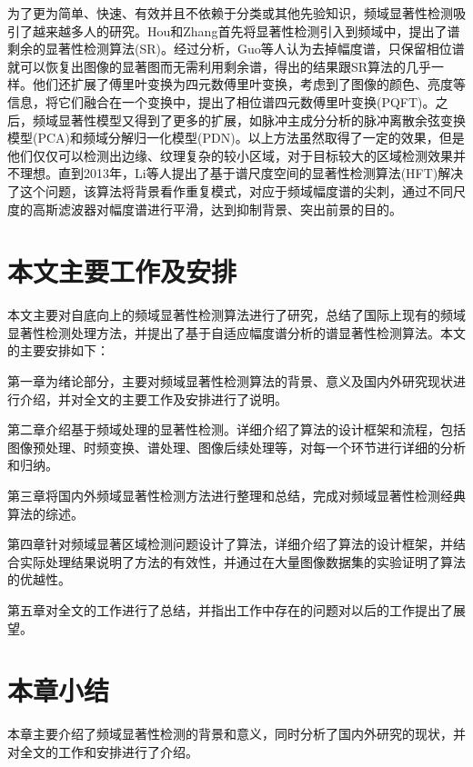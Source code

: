 为了更为简单、快速、有效并且不依赖于分类或其他先验知识，频域显著性检测吸引了越来越多人的研究。Hou和Zhang首先将显著性检测引入到频域中，提出了谱剩余的显著性检测算法(SR)\cite{HouXiaodiCVPR2007Residual}。经过分析，Guo等人\cite{GuoChenleiCVPR2008Spatio}认为去掉幅度谱，只保留相位谱就可以恢复出图像的显著图而无需利用剩余谱，得出的结果跟SR算法的几乎一样。他们还扩展了傅里叶变换为四元数傅里叶变换，考虑到了图像的颜色、亮度等信息，将它们融合在一个变换中，提出了相位谱四元数傅里叶变换(PQFT)。之后，频域显著性模型又得到了更多的扩展，如脉冲主成分分析的脉冲离散余弦变换模型(PCA)\cite{YuICDL2009Spatio}和频域分解归一化模型(PDN)\cite{BianCognNeurodyn2010Visual}。以上方法虽然取得了一定的效果，但是他们仅仅可以检测出边缘、纹理复杂的较小区域，对于目标较大的区域检测效果并不理想。直到2013年，Li等人提出了基于谱尺度空间的显著性检测算法(HFT)\cite{LiJianTPAMI2013Scale}解决了这个问题，该算法将背景看作重复模式，对应于频域幅度谱的尖刺，通过不同尺度的高斯滤波器对幅度谱进行平滑，达到抑制背景、突出前景的目的。

\section{本文主要工作及安排}
\label{1_3}

本文主要对自底向上的频域显著性检测算法进行了研究，总结了国际上现有的频域显著性检测处理方法，并提出了基于自适应幅度谱分析的谱显著性检测算法。本文的主要安排如下：

第一章为绪论部分，主要对频域显著性检测算法的背景、意义及国内外研究现状进行介绍，并对全文的主要工作及安排进行了说明。

第二章介绍基于频域处理的显著性检测。详细介绍了算法的设计框架和流程，包括图像预处理、时频变换、谱处理、图像后续处理等，对每一个环节进行详细的分析和归纳。

第三章将国内外频域显著性检测方法进行整理和总结，完成对频域显著性检测经典算法的综述。

第四章针对频域显著区域检测问题设计了算法，详细介绍了算法的设计框架，并结合实际处理结果说明了方法的有效性，并通过在大量图像数据集的实验证明了算法的优越性。

第五章对全文的工作进行了总结，并指出工作中存在的问题对以后的工作提出了展望。

\section{本章小结}
\label{1_4}

本章主要介绍了频域显著性检测的背景和意义，同时分析了国内外研究的现状，并对全文的工作和安排进行了介绍。

